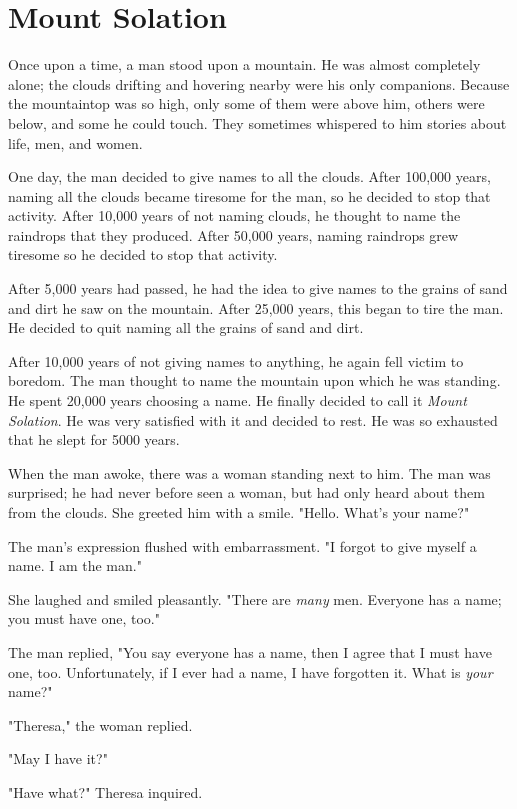 \chapter{Mount Solation}

Once upon a time, a man stood upon a mountain. He was almost completely alone; the clouds drifting and hovering nearby were his only companions. Because the mountaintop was so high, only some of them were above him, others were below, and some he could touch. They sometimes whispered to him stories about life, men, and women.

One day, the man decided to give names to all the clouds. After 100,000 years, naming all the clouds became tiresome for the man, so he decided to stop that activity. After 10,000 years of not naming clouds, he thought to name the raindrops that they produced. After 50,000 years, naming raindrops grew tiresome so he decided to stop that activity.

After 5,000 years had passed, he had the idea to give names to the grains of sand and dirt he saw on the mountain. After 25,000 years, this began to tire the man. He decided to quit naming all the grains of sand and dirt.

After 10,000 years of not giving names to anything, he again fell victim to boredom. The man thought to name the mountain upon which he was standing. He spent 20,000 years choosing a name. He finally decided to call it \textit{Mount Solation}. He was very satisfied with it and decided to rest. He was so exhausted that he slept for 5000 years.

When the man awoke, there was a woman standing next to him. The man was surprised; he had never before seen a woman, but had only heard about them from the clouds. She greeted him with a smile. "Hello. What's your name?"

The man's expression flushed with embarrassment. "I forgot to give myself a name. I am the man."

She laughed and smiled pleasantly. "There are \textit{many} men. Everyone has a name; you must have one, too."

The man replied, "You say everyone has a name, then I agree that I must have one, too. Unfortunately, if I ever had a name, I have forgotten it. What is \textit{your} name?"

"Theresa," the woman replied.

"May I have it?"

"Have what?" Theresa inquired.

